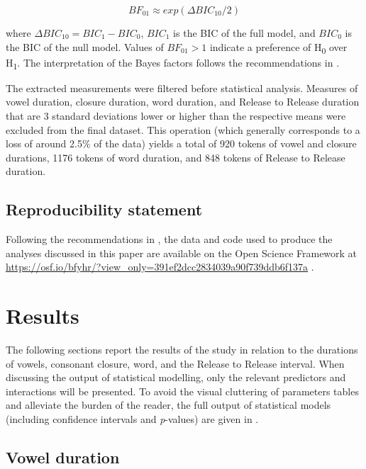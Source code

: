\documentclass[preprint]{JASAnew}
\begin{document}
\begin{equation}
\label{eq:bayes}
BF_{01} \approx exp(\Delta{}BIC_{10}/2)
\end{equation}

where \(\Delta{}BIC_{10} = BIC_1 - BIC_0\), \(BIC_1\) is the BIC of the
full model, and \(BIC_0\) is the BIC of the null model. Values of
\(BF_{01} > 1\) indicate a preference of H\textsubscript{0} over
H\textsubscript{1}. The interpretation of the Bayes factors follows the
recommendations in \citet[p.~139]{raftery1995}.

The extracted measurements were filtered before statistical analysis.
Measures of vowel duration, closure duration, word duration, and Release
to Release duration that are 3 standard deviations lower or higher than
the respective means were excluded from the final dataset. This
operation (which generally corresponds to a loss of around 2.5\% of the
data) yields a total of 920 tokens of vowel and closure durations, 1176
tokens of word duration, and 848 tokens of Release to Release duration.

\subsection{Reproducibility statement}\label{reproducibility-statement}

Following the recommendations in \citet{berez-kroeker2018}, the data and
code used to produce the analyses discussed in this paper are available
on the Open Science Framework at
\url{https://osf.io/bfyhr/?view_only=391ef2dcc2834039a90f739ddb6f137a}
\citep{coretta2018g}.

\section{Results}\label{results}

The following sections report the results of the study in relation to
the durations of vowels, consonant closure, word, and the Release to
Release interval. When discussing the output of statistical modelling,
only the relevant predictors and interactions will be presented. To
avoid the visual cluttering of parameters tables and alleviate the
burden of the reader, the full output of statistical models (including
confidence intervals and \emph{p}-values) are given in .

\subsection{Vowel duration}\label{vowel-duration}
\end{document}
